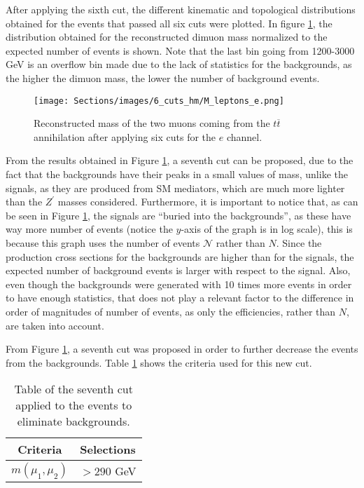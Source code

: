 After applying the sixth cut, the different kinematic and topological distributions obtained for the events that passed all six cuts were plotted. In figure \ref{6cutsHm_Mleptons_e}, the distribution obtained for the reconstructed dimuon mass normalized to the expected number of events is shown. Note that the last bin going from 1200-3000 GeV is an overflow bin made due to the lack of statistics for the backgrounds, as the higher the dimuon mass, the lower the number of background events.

\begin{figure}[ht]
    \centering
    \texttt{[image: Sections/images/6\_cuts\_hm/M\_leptons\_e.png]}
    \caption{Reconstructed mass of the two muons coming from the $t\overline t$ annihilation after applying six cuts for the $e$ channel.}
    \label{6cutsHm_Mleptons_e}
\end{figure}

From the results obtained in Figure \ref{6cutsHm_Mleptons_e}, a seventh cut can be proposed, due to the fact that the backgrounds have their peaks in a small values of mass, unlike the signals, as they are produced from SM mediators, which are much more lighter than the $Z^{\prime}$ masses considered. Furthermore, it is important to notice that, as can be seen in Figure \ref{6cutsHm_Mleptons_e}, the signals are ``buried into the backgrounds'', as these have way more number of events (notice the $y$-axis of the graph is in log scale), this is because this graph uses the number of events $\mathcal{N}$ rather than $N$. Since the production cross sections for the backgrounds are higher than for the signals, the expected number of background events is larger with respect to the signal. Also, even though the backgrounds were generated with 10 times more events in order to have enough statistics, that does not play a relevant factor to the difference in order of magnitudes of number of events, as only the efficiencies, rather than $N$, are taken into account.

From Figure \ref{6cutsHm_Mleptons_e}, a seventh cut was proposed in order to further decrease the events from the backgrounds. Table \ref{cut7} shows the criteria used for this new cut.

\begin{table}[ht!]
\centering
\caption{Table of the seventh cut applied to the events to eliminate backgrounds.}
\label{cut7}
\begin{tabular}{cc}
\hline
\hline
 Criteria & Selections \\
\hline
 $m(\mu_1, \mu_2)$ & $> 290$ GeV  \\
\hline
\hline
\end{tabular}
\end{table}


